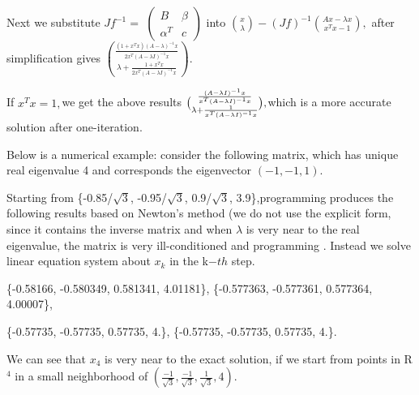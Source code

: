 \documentclass{article}
\begin{document}
Next we substitute $Jf^{-1}=$ $\left( 
\begin{array}{cc}
B & \beta  \\ 
\alpha ^{T} & c%
\end{array}%
\right) $ into $\binom{x}{\lambda }-\left( Jf\right) ^{-1}\binom{Ax-\lambda x%
}{x^{T}x-1},$ after simplification gives $\binom{\frac{\left(
1+x^{T}x\right) \left( A-\lambda \right) ^{-1}x}{2x^{T}\left( A-\lambda
I\right) ^{-1}x}}{\lambda +\frac{1+x^{T}x}{2x^{T}\left( A-\lambda I\right)
^{-1}x}}.$

If $x^{T}x=1,$we get the above results $\binom{\frac{\left( A-\lambda
I\right) ^{-1}x}{x^{T}\left( A-\lambda I\right) ^{-1}x}}{\lambda +\frac{1}{%
x^{T}\left( A-\lambda I\right) ^{-1}x}},$which is a more accurate solution
after one-iteration.

Below is a numerical example: consider the following matrix, which has
unique real eigenvalue 4 and corresponds the eigenvector $\left(
-1,-1,1\right) .$ %

Starting from \{-0.85/$\sqrt{3}$, -0.95/$\sqrt{3}$, 0.9/$\sqrt{3}$,
3.9\},programming produces the following results based on Newton's method
(we do not use the explicit form, since it contains the inverse matrix and
when $\lambda $ is very near to the real eigenvalue, the matrix is very
ill-conditioned and programming . Instead we solve linear equation system
about $x_{k}$ in the k$-th$ step.

\{-0.58166, -0.580349, 0.581341, 4.01181\}, \{-0.577363, -0.577361,
0.577364, 4.00007\},

\{-0.57735, -0.57735, 0.57735, 4.\}, \{-0.57735, -0.57735, 0.57735, 4.\}.

We can see that $x_{4}$ is very near to the exact solution, if we start from
points in R$^{4}$ in a small neighborhood of $\left( \frac{-1}{\sqrt{3}},%
\frac{-1}{\sqrt{3}},\frac{1}{\sqrt{3}},4\right) .$
\end{document}
